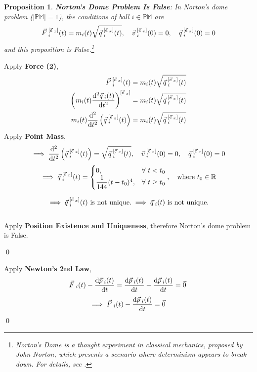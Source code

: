 \documentclass[12pt]{amsart}
\newtheorem{proposition}[theorem]{Proposition}
\renewenvironment{proof}{{\bfseries Proof.}}{\qed}
\let\oldvec\vec
\renewcommand{\vec}[1]{\oldvec{#1}\hspace{0.1em}}
\begin{document}
\begin{proposition}
    \textbf{Norton's Dome Problem Is False}: In Norton's dome problem ($\left |\mathbb{PM}\right | = 1$), the conditions of ball $i \in \mathbb{PM}$ are 
    $$ \vec{F}_i^{[\vec{e}_x]}(t) = m_i(t) \sqrt{\vec{q}_i^{[\vec{e}_x]}(t)} , \quad \vec{v}_i^{[\vec{e}_x]}(0) = 0, \quad \vec{q}_i^{[\vec{e}_x]}(0) = 0$$
    and this proposition is False.\footnote{Norton's Dome is a thought experiment in classical mechanics, proposed by John Norton, which presents a scenario where determinism appears to break down. For details, see \cite{norton2008dome}.}
\end{proposition}

\begin{proof}
    Apply \textbf{Force (2)},
    \begin{align*}
    \vec{F}_i^{[\vec{e}_x]}(t) &= m_i(t)\sqrt{\vec{q}_i^{[\vec{e}_x]}(t)} \\
    \left ( m_i(t) \dfrac{\mathrm{d}^2 \vec{q}_{i} (t)}{\mathrm{d} t^2} \right )^{[\vec{e}_x]} &= m_i(t)\sqrt{\vec{q}_i^{[\vec{e}_x]}(t)}\\
     m_i(t) \dfrac{\mathrm{d}^2 }{\mathrm{d} t^2} \left ( \vec{q}^{[\vec{e}_x]}_{i} (t) \right ) &= m_i(t)\sqrt{\vec{q}_i^{[\vec{e}_x]}(t)}
    \end{align*}
    Apply \textbf{Point Mass},
    $$
    \implies \dfrac{\mathrm{d}^2 }{\mathrm{d} t^2} \left ( \vec{q}^{[\vec{e}_x]}_{i} (t) \right ) = \sqrt{\vec{q}_i^{[\vec{e}_x]}(t)}, \quad \vec{v}_i^{[\vec{e}_x]}(0) = 0, \quad \vec{q}_i^{[\vec{e}_x]}(0) = 0 
    $$
    $$
    \implies \vec{q}^{[\vec{e}_x]}_{i}(t) = \begin{cases} 0, & \forall \ t<t_0 \\ \dfrac{1}{144}(t - t_0)^4, & \forall \ t \geq t_0 \end{cases}, \quad \text{where } t_0 \in \mathbb{R}
    $$
    
    $$
    \implies \vec{q}^{[\vec{e}_x]}_{i}(t) \text{ is not unique.} \implies \vec{q}_{i}(t) \text{ is not unique.} 
    $$
    \\
    Apply \textbf{Position Existence and Uniqueness}, therefore Norton's dome problem is False.
    
\end{proof}

\begin{proof}
Apply \textbf{Newton's 2nd Law},
$$ \vec{F}_{i}(t) - \dfrac{\mathrm{d} \vec{p}_{i}(t)}{\mathrm{d} t} = \dfrac{\mathrm{d} \vec{p}_{i}(t)}{\mathrm{d} t} - \dfrac{\mathrm{d} \vec{p}_{i}(t)}{\mathrm{d} t} = \vec{0} $$
$$ \implies \vec{F}_{i}(t) - \dfrac{\mathrm{d} \vec{p}_{i}(t)}{\mathrm{d} t} = \vec{0} $$
\end{proof}
\end{document}
